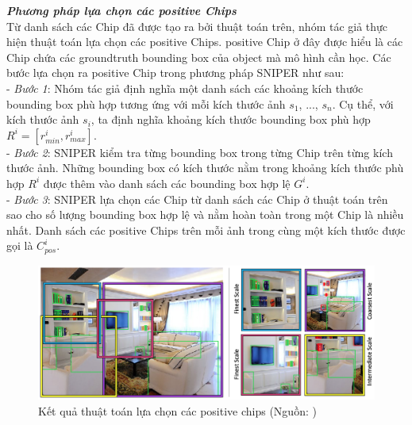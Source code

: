{    \noindent
    \textbf{\textit{Phương pháp lựa chọn các positive Chips}} \\
    Từ danh sách các Chip đã được tạo ra bởi thuật toán trên, nhóm tác giả thực hiện thuật toán lựa chọn các positive Chips.
    positive Chip ở đây được hiểu là các Chip chứa các groundtruth bounding box của object mà mô hình cần học.
    Các bước lựa chọn ra positive Chip trong phương pháp SNIPER như sau: \\
    - \textit{Bước 1}: Nhóm tác giả định nghĩa một danh sách các khoảng kích thước bounding box phù hợp tương ứng với mỗi kích thước ảnh {${s}_{1}$, ..., ${s}_{n}$}.
    Cụ thể, với kích thước ảnh ${s}_{i}$, ta định nghĩa khoảng kích thước bounding box phù hợp ${R}^{i} = [{r}_{min}^{i}, {r}_{max}^{i}]$. \\
    - \textit{Bước 2}: SNIPER kiểm tra từng bounding box trong từng Chip trên từng kích thước ảnh.
    Những bounding box có kích thước nằm trong khoảng kích thước phù hợp ${R}^{i}$ được thêm vào danh sách các bounding box hợp lệ ${G}^{i}$. \\
    - \textit{Bước 3}: SNIPER lựa chọn các Chip từ danh sách các Chip ở thuật toán trên sao cho số lượng bounding box hợp lệ và nằm hoàn toàn trong một Chip là nhiều nhất.
    Danh sách các positive Chips trên mỗi ảnh trong cùng một kích thước được gọi là ${C}_{pos}^{i}$.

    \begin{figure}[H]
        \centering
        \includegraphics[width=13cm] {images/sniper_pos_chip}
        \caption{Kết quả thuật toán lựa chọn các positive chips (Nguồn: \cite{singh2018sniper})}
        \label{fig:sniper_pos_chip}
    \end{figure}

}
